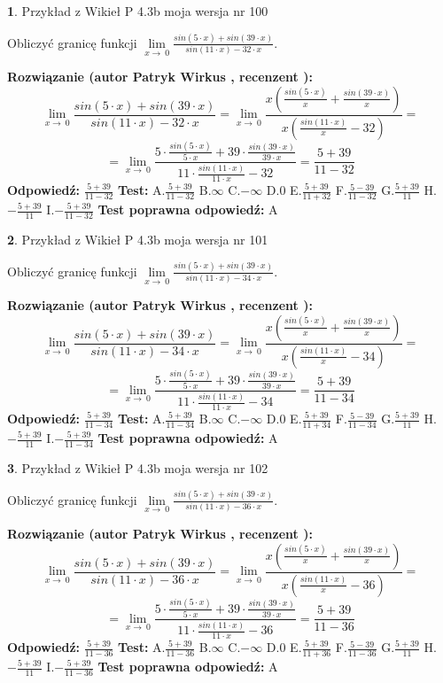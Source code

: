 \documentclass[12pt, a4paper]{article}
\theoremstyle{definition} %
\newtheorem{zad}{}
\newcommand{\zadStart}[1]{\begin{zad}#1\newline}
\newcommand{\zadStop}{\end{zad}}
\newcommand{\rozwStart}[2]{\noindent \textbf{Rozwiązanie (autor #1 , recenzent #2): }\newline}
\newcommand{\rozwStop}{\newline}
\newcommand{\odpStart}{\noindent \textbf{Odpowiedź:}\newline}
\newcommand{\odpStop}{\newline}
\newcommand{\testStart}{\noindent \textbf{Test:}\newline}
\newcommand{\testStop}{\newline}
\newcommand{\kluczStart}{\noindent \textbf{Test poprawna odpowiedź:}\newline}
\newcommand{\kluczStop}{\newline}
\begin{document}
\zadStart{Przykład z Wikieł P 4.3b moja wersja nr 100}


Obliczyć granicę funkcji $\lim\limits_{x\to\ 0}\frac{sin(5 \cdot x)+sin(39 \cdot x)}{sin(11 \cdot x)-32 \cdot x}$.
\zadStop
\rozwStart{Patryk Wirkus}{}
$$\lim\limits_{x\to\ 0}\frac{sin(5 \cdot x)+sin(39 \cdot x)}{sin(11 \cdot x)-32 \cdot x}=\lim\limits_{x\to\ 0}\frac{x(\frac{sin(5 \cdot x)}{x}+\frac{sin(39 \cdot x)}{x})}{x(\frac{sin(11 \cdot x)}{x}-32)}=$$
$$=\lim\limits_{x\to\ 0}\frac{5 \cdot \frac{sin(5 \cdot x)}{5 \cdot x}+39 \cdot \frac{sin(39 \cdot x)}{39 \cdot x}}{11 \cdot \frac{sin(11 \cdot x)}{11 \cdot x}-32}=\frac{5+39}{11-32}$$
\rozwStop
\odpStart
$\frac{5+39}{11-32}$
\odpStop
\testStart
A.$\frac{5+39}{11-32}$
B.$\infty$
C.$-\infty$
D.$0$
E.$\frac{5+39}{11+32}$
F.$\frac{5-39}{11-32}$
G.$\frac{5+39}{11}$
H.$-\frac{5+39}{11}$
I.$-\frac{5+39}{11-32}$
\testStop
\kluczStart
A
\kluczStop



\zadStart{Przykład z Wikieł P 4.3b moja wersja nr 101}


Obliczyć granicę funkcji $\lim\limits_{x\to\ 0}\frac{sin(5 \cdot x)+sin(39 \cdot x)}{sin(11 \cdot x)-34 \cdot x}$.
\zadStop
\rozwStart{Patryk Wirkus}{}
$$\lim\limits_{x\to\ 0}\frac{sin(5 \cdot x)+sin(39 \cdot x)}{sin(11 \cdot x)-34 \cdot x}=\lim\limits_{x\to\ 0}\frac{x(\frac{sin(5 \cdot x)}{x}+\frac{sin(39 \cdot x)}{x})}{x(\frac{sin(11 \cdot x)}{x}-34)}=$$
$$=\lim\limits_{x\to\ 0}\frac{5 \cdot \frac{sin(5 \cdot x)}{5 \cdot x}+39 \cdot \frac{sin(39 \cdot x)}{39 \cdot x}}{11 \cdot \frac{sin(11 \cdot x)}{11 \cdot x}-34}=\frac{5+39}{11-34}$$
\rozwStop
\odpStart
$\frac{5+39}{11-34}$
\odpStop
\testStart
A.$\frac{5+39}{11-34}$
B.$\infty$
C.$-\infty$
D.$0$
E.$\frac{5+39}{11+34}$
F.$\frac{5-39}{11-34}$
G.$\frac{5+39}{11}$
H.$-\frac{5+39}{11}$
I.$-\frac{5+39}{11-34}$
\testStop
\kluczStart
A
\kluczStop



\zadStart{Przykład z Wikieł P 4.3b moja wersja nr 102}


Obliczyć granicę funkcji $\lim\limits_{x\to\ 0}\frac{sin(5 \cdot x)+sin(39 \cdot x)}{sin(11 \cdot x)-36 \cdot x}$.
\zadStop
\rozwStart{Patryk Wirkus}{}
$$\lim\limits_{x\to\ 0}\frac{sin(5 \cdot x)+sin(39 \cdot x)}{sin(11 \cdot x)-36 \cdot x}=\lim\limits_{x\to\ 0}\frac{x(\frac{sin(5 \cdot x)}{x}+\frac{sin(39 \cdot x)}{x})}{x(\frac{sin(11 \cdot x)}{x}-36)}=$$
$$=\lim\limits_{x\to\ 0}\frac{5 \cdot \frac{sin(5 \cdot x)}{5 \cdot x}+39 \cdot \frac{sin(39 \cdot x)}{39 \cdot x}}{11 \cdot \frac{sin(11 \cdot x)}{11 \cdot x}-36}=\frac{5+39}{11-36}$$
\rozwStop
\odpStart
$\frac{5+39}{11-36}$
\odpStop
\testStart
A.$\frac{5+39}{11-36}$
B.$\infty$
C.$-\infty$
D.$0$
E.$\frac{5+39}{11+36}$
F.$\frac{5-39}{11-36}$
G.$\frac{5+39}{11}$
H.$-\frac{5+39}{11}$
I.$-\frac{5+39}{11-36}$
\testStop
\kluczStart
A
\kluczStop
\end{document}
